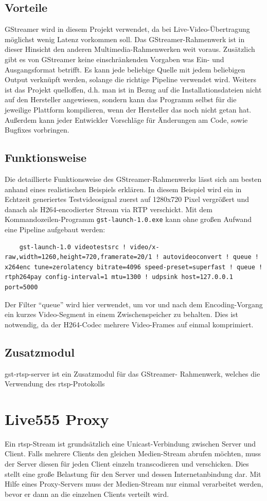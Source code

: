 \subsection{Vorteile}
GStreamer wird in diesem Projekt verwendet, da bei Live-Video-Übertragung möglichst wenig Latenz vorkommen soll.
Das GStreamer-Rahmenwerk ist in dieser Hinsicht den anderen Multimedia-Rahmenwerken weit voraus.
Zusätzlich gibt es von GStreamer keine einschränkenden Vorgaben was Ein- und Ausgangsformat betrifft.
Es kann jede beliebige Quelle mit jedem beliebigen Output verknüpft werden, solange die richtige Pipeline verwendet wird.
Weiters ist das Projekt quelloffen, d.h. man ist in Bezug auf die Installationsdateien nicht auf den Hersteller angewiesen, sondern kann das Programm selbst für die jeweilige Plattform kompilieren, wenn der Hersteller das noch nicht getan hat.
Außerdem kann jeder Entwickler Vorschläge für Änderungen am Code, sowie Bugfixes vorbringen.
\subsection{Funktionsweise}
Die detaillierte Funktionsweise des GStreamer-Rahmenwerks lässt sich am besten anhand eines realistischen Beispiels erklären.
In diesem Beispiel wird ein in Echtzeit generiertes Testvideosignal zuerst auf 1280x720 Pixel vergrößert und danach als H264-encodierter Stream via RTP verschickt.
Mit dem Kommandozeilen-Programm \texttt{gst-launch-1.0.exe} kann ohne großen Aufwand eine Pipeline aufgebaut werden:
\begin{lstlisting}
    gst-launch-1.0 videotestsrc ! video/x-raw,width=1260,height=720,framerate=20/1 ! autovideoconvert ! queue ! x264enc tune=zerolatency bitrate=4096 speed-preset=superfast ! queue ! rtph264pay config-interval=1 mtu=1300 ! udpsink host=127.0.0.1 port=5000
\end{lstlisting}
Der Filter \enquote{queue} wird hier verwendet, um vor und nach dem Encoding-Vorgang ein kurzes Video-Segment in einem Zwischenspeicher zu behalten. Dies ist notwendig, da der H264-Codec mehrere Video-Frames auf einmal komprimiert.

\subsection{Zusatzmodul}
gst-rtsp-server ist ein Zusatzmodul für das GStreamer- Rahmenwerk, welches die Verwendung des \acs{rtsp}-Protokolls 

\section{Live555 Proxy}
Ein \acs{rtsp}-Stream ist grundsätzlich eine Unicast-Verbindung zwischen Server und Client.
Falls mehrere Clients den gleichen Medien-Stream abrufen möchten, muss der Server diesen für jeden Client einzeln transcodieren und verschicken.
Dies stellt eine große Belastung für den Server und dessen Internetanbindung dar.
Mit Hilfe eines Proxy-Servers muss der Medien-Stream nur einmal verarbeitet werden, bevor er dann an die einzelnen Clients verteilt wird.\par

